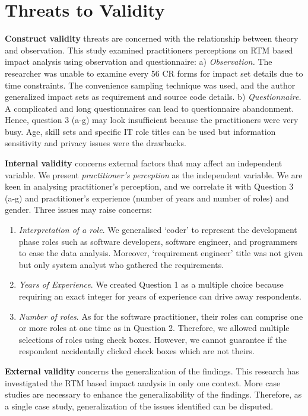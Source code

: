\documentclass[conference]{IEEEtran}
\begin{document}
\section{Threats to Validity}

\textbf{Construct validity} threats are concerned with the
relationship between theory and observation. This study examined
practitioners perceptions on RTM based impact analysis using
observation and questionnaire: a) \textit{Observation.} The researcher
was unable to examine every 56 CR forms for impact set details due to
time constraints. The convenience sampling technique was used, and the
author generalized impact sets as requirement and source code details.
b) \textit{Questionnaire.} A complicated and long questionnaires can
lead to questionnaire abandonment. Hence, question 3 (a-g) may look
insufficient because the practitioners were very busy. Age, skill sets
and specific IT role titles can be used but information sensitivity
and privacy issues were the drawbacks.

\textbf{Internal validity} concerns external factors that may affect
an independent variable. We present \textit{practitioner's perception}
as the independent variable. We are keen in analysing practitioner's
perception, and we correlate it with Question 3 (a-g) and
practitioner's experience (number of years and number of roles) and
gender. Three issues may raise concerns: 

\begin{enumerate}
\item \textit{Interpretation of a role}. We generalised `coder' to
represent the development phase roles such as software developers,
software engineer, and programmers to ease the data
analysis. Moreover, `requirement engineer' title was not given but
only system analyst who gathered the requirements.  
\item \textit{Years of Experience}. We created Question 1 as a
  multiple choice because requiring an exact integer for years of
  experience can drive away respondents.
\item \textit{Number of roles}. As for the software practitioner,
  their roles can comprise one or more roles at one time as in
  Question 2. Therefore, we allowed multiple selections of roles using
  check boxes. However, we cannot guarantee if the respondent
  accidentally clicked check boxes which are not theirs.
\end{enumerate}


\textbf{External validity} concerns the generalization of the
findings. This research has investigated the RTM based impact analysis
in only one context. More case studies are necessary to enhance the
generalizability of the findings. Therefore, as a single case study,
generalization of the issues identified can be disputed.
\end{document}
